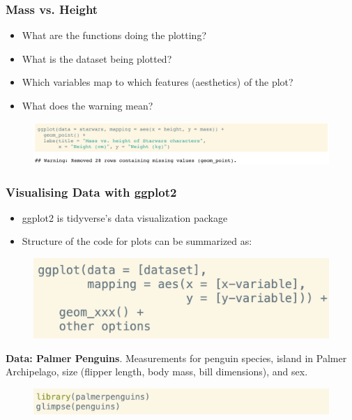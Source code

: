 \documentclass[11pt]{beamer}
\begin{document}
	\begin{frame}
		
		\frametitle{\textbf{Mass vs. Height}}
		
		\begin{itemize}
			\item What are the functions doing the plotting?
			\item What is the dataset being plotted?
			\item Which variables map to which features (aesthetics) of the plot?
			\item What does the warning mean?
		\end{itemize}
		\begin{figure}
		\centering
		\includegraphics[width=1\linewidth]{Images/S2/code/s3}

		
	\end{figure}
	\end{frame}
	
		\begin{frame}
		
		\frametitle{\textbf{Visualising Data with ggplot2}}
		
\begin{itemize}
	\item ggplot2 is tidyverse's data visualization package
	\item Structure of the code for plots can be summarized as:
\end{itemize}
\begin{figure}
	\centering
	\includegraphics[width=0.5\linewidth]{Images/S2/code/s4}

\end{figure}
\textbf{Data: Palmer Penguins}. Measurements for penguin species, island in Palmer Archipelago, size (flipper length, body mass, bill dimensions), and sex.
\begin{figure}
	\centering
	\includegraphics[width=0.7\linewidth]{Images/S2/code/s5}
	
\end{figure}

	\end{frame}
	
\end{document}
